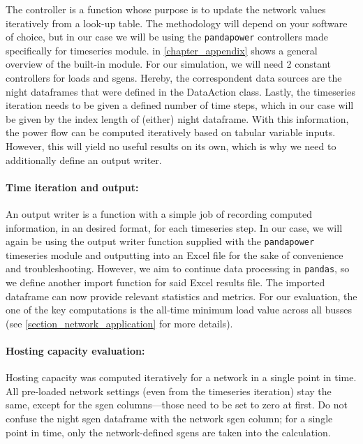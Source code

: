 \documentclass[a4paper,10pt]{report}
\begin{document}
The controller is a function whose purpose is to update the network values iteratively from a look-up table. The methodology will depend on your software of choice, but in our case we will be using the \texttt{pandapower} controllers made specifically for timeseries module.  in \cref{chapter_appendix} shows a general overview of the built-in module.
For our simulation, we will need 2 constant controllers for loads and sgens. Hereby, the correspondent data sources are the night dataframes that were defined in the DataAction class. Lastly, the timeseries iteration needs to be given a defined number of time steps, which in our case will be given by the index length of (either) night dataframe. With this information, the power flow can be computed iteratively based on tabular variable inputs. However, this will yield no useful results on its own, which is why we need to additionally define an output writer.

\paragraph{Time iteration and output:} An output writer is a function with a simple job of recording computed information, in an desired format, for each timeseries step. In our case, we will again be using the output writer function supplied with the \texttt{pandapower} timeseries module and outputting into an Excel file for the sake of convenience and troubleshooting. However, we aim to continue data processing in \texttt{pandas}, so we define another import function for said Excel results file. The imported dataframe can now provide relevant statistics and metrics. For our evaluation, the one of the key computations is the all-time minimum load value across all busses (see \cref{section_network_application} for more details).

\paragraph{Hosting capacity evaluation:} Hosting capacity was computed iteratively for a network in a single point in time. All pre-loaded network settings (even from the timeseries iteration) stay the same, except for the sgen columns---those need to be set to zero at first. Do not confuse the night sgen dataframe with the network sgen column; for a single point in time, only the network-defined sgens are taken into the calculation.
\end{document}
